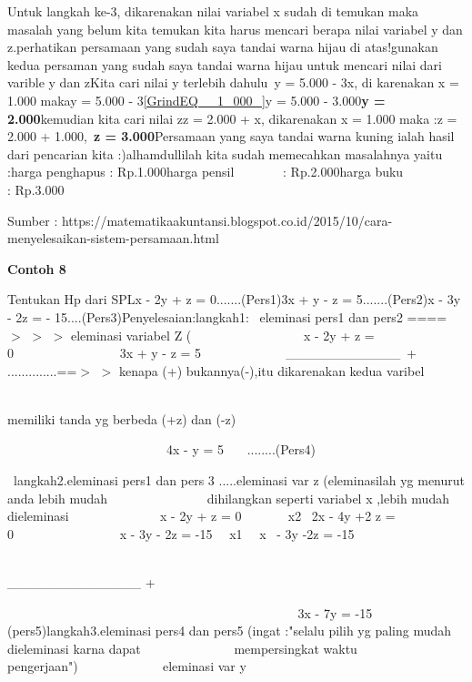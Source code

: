 \documentclass[11pt,fleqn]{book} %
\begin{document}
\noindent Untuk langkah ke-3, dikarenakan nilai variabel x sudah di temukan maka masalah yang belum kita temukan kita harus mencari berapa nilai variabel y dan z.perhatikan persamaan yang sudah saya tandai warna hijau di atas!gunakan kedua persaman yang sudah saya tandai warna hijau untuk mencari nilai dari varible y dan zKita cari nilai y terlebih dahulu~y = 5.000 - 3x, di karenakan x = 1.000 makay = 5.000 - 3\eqref{GrindEQ__1_000_}y = 5.000 - 3.000\textbf{y = 2.000}kemudian kita cari nilai zz = 2.000 + x, dikarenakan x = 1.000 maka :z = 2.000 + 1.000,~\textbf{z = 3.000}Persamaan yang saya tandai warna kuning ialah hasil dari pencarian kita :)alhamdullilah kita sudah memecahkan masalahnya yaitu :harga penghapus : Rp.1.000harga pensil~~~~~~~ : Rp.2.000harga buku~~~~~~~~~ : Rp.3.000

\noindent Sumber : https://matematikaakuntansi.blogspot.co.id/2015/10/cara-menyelesaikan-sistem-persamaan.html

\noindent \textbf{Contoh 8}

\noindent Tentukan Hp dari SPLx - 2y + z = 0.......(Pers1)3x + y - z = 5.......(Pers2)x - 3y - 2z = - 15....(Pers3)Penyelesaian:langkah1:~ eleminasi pers1 dan pers2 ==== $>$ $>$ $>$ eleminasi variabel Z (~~~~~~~~~~~~~~~~~ x - 2y + z = 0~~~~~~~~~~~~~~~~ 3x + y - z = 5~ ~ ~ ~ ~ ~ ~ ~ \_\_\_\_\_\_\_\_\_\_\_\_~+ ~~ ..............==$>$ $>$ kenapa (+) bukannya(-),itu dikarenakan kedua varibel

\noindent ~~~~~~~~~~~~~~~~~~~~~~~~~~~~~~~~~~~~~~~~~~~~~~~~~~~~~~~~~~~~~~~~~~~~~~~ memiliki tanda yg berbeda (+z) dan (-z)

\noindent ~~~~~~~~~~~~~~~~~~~~~~~~~4x - y = 5~~~ ........(Pers4)

\noindent ~langkah2.eleminasi pers1 dan pers 3 .....eleminasi var z (eleminasilah yg menurut anda lebih mudah~~~~~~~~~~~~~~~ dihilangkan seperti variabel x ,lebih mudah dieleminasi~ ~ ~ ~ ~ ~ ~ ~~ x - 2y + z = 0 ~~~~~~ {\textbar}x2{\textbar}~ 2x - 4y +2 z = 0~~~~~~~~~~~~~~~~ x - 3y - 2z = -15~~ {\textbar}x1{\textbar}~~ x~ - 3y -2z = -15

\noindent ~~~~~~~~~~~~~~~~~~~~~~~~~~~~~~~~~~~~~~~~~~~~~~~~~~~~~ \_\_\_\_\_\_\_\_\_\_\_\_\_\_ + ~ ~ ~

\noindent ~ ~ ~ ~ ~ ~ ~ ~ ~ ~ ~ ~ ~ ~ ~ ~ ~ ~ ~ ~ ~ ~ ~ ~ ~~ ~~~3x - 7y = -15~~~~~~~ (pers5)langkah3.eleminasi pers4 dan pers5 (ingat :"selalu pilih yg paling mudah dieleminasi karna dapat~~~~~~~~~~~~~~ mempersingkat waktu pengerjaan")~~~~~~~~~~ ~~ eleminasi var y

\noindent ~~~~~~~~~~~~~~~
\end{document}
